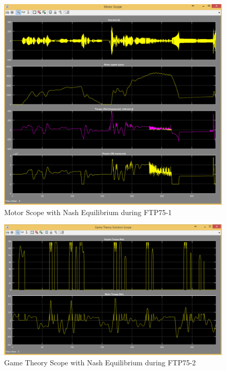 \begin{figure}[h]
\centering
\includegraphics[scale=0.37]{figures/NashEquilibrium/FTP75-1/motor13Juni}
\caption{Motor Scope with Nash Equilibrium during FTP75-1}
\label{fig:mne1}
\end{figure}


\begin{figure}[h]
\centering
\includegraphics[scale=0.4]{figures/NashEquilibrium/FTP75-2/gameTheory13Juni}
\caption{Game Theory Scope with Nash Equilibrium during FTP75-2}
\label{fig:gtne2}
\end{figure}

